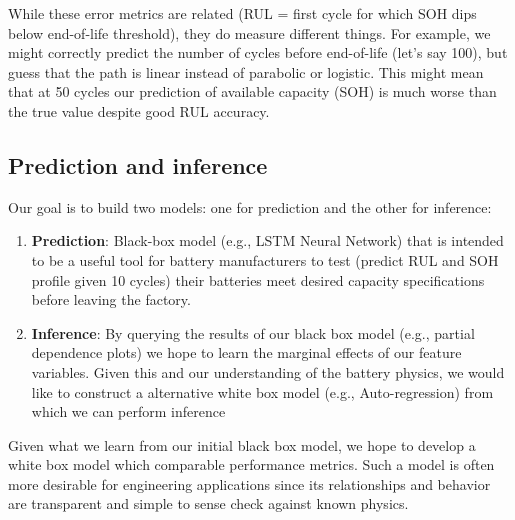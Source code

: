 \documentclass{article}
\begin{document}
While these error metrics are related (RUL = first cycle for which SOH dips below end-of-life threshold), they do measure different things. For example, we might correctly predict the number of cycles before end-of-life (let's say 100), but guess that the path is linear instead of parabolic or logistic. This might mean that at 50 cycles our prediction of available capacity (SOH) is much worse than the true value despite good RUL accuracy. 

\subsection{Prediction and inference}

Our goal is to build two models: one for prediction and the other for inference:
\begin{enumerate}
    \item \textbf{Prediction}: Black-box model (e.g., LSTM Neural Network) that is intended to be a useful tool for battery manufacturers to test (predict RUL and SOH profile given 10 cycles) their batteries meet desired capacity specifications before leaving the factory. 
    \item \textbf{Inference}: By querying the results of our black box model (e.g., partial dependence plots) we hope to learn the marginal effects of our feature variables. Given this and our understanding of the battery physics, we would like to construct a alternative white box model (e.g., Auto-regression) from which we can perform inference
\end{enumerate}

Given what we learn from our initial black box model, we hope to develop a white box model which comparable performance metrics. Such a model is often more desirable for engineering applications since its relationships and behavior are transparent and simple to sense check against known physics.
\end{document}
